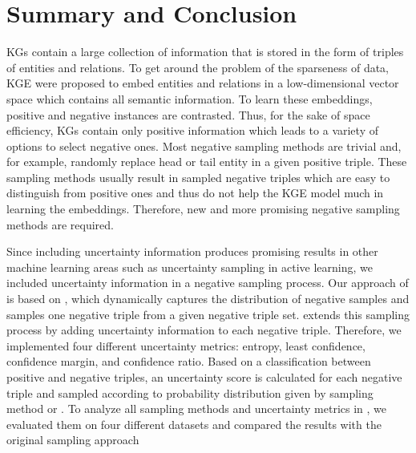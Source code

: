 \section{Summary and Conclusion}  
\label{sec:summary_and_conclusion}
\acp{KG} contain a large collection of information that is stored in the form of triples of entities and relations.
To get around the problem of the sparseness of data, \ac{KGE} were proposed to embed entities and relations in a low-dimensional vector space which contains all semantic information.
To learn these embeddings, positive and negative instances are contrasted.
Thus, for the sake of space efficiency, \acp{KG} contain only positive information which leads to a variety of options to select negative ones.
Most negative sampling methods are trivial and, for example, randomly replace head or tail entity in a given positive triple.
These sampling methods usually result in sampled negative triples which are easy to distinguish from positive ones and thus do not help the \ac{KGE} model much in learning the embeddings. 
Therefore, new and more promising negative sampling methods are required.

Since including uncertainty information produces promising results in other machine learning areas such as uncertainty sampling in active learning, we included uncertainty information in a negative sampling process.
Our approach of \usgan is based on \kbgan, which dynamically captures the distribution of negative samples and samples one negative triple from a given negative triple set.
\usgan extends this sampling process by adding uncertainty information to each negative triple.
Therefore, we implemented four different uncertainty metrics: entropy, least confidence, confidence margin, and confidence ratio.
Based on a classification between positive and negative triples, an uncertainty score is calculated for each negative triple and sampled according to probability distribution given by sampling method \ussoftmax or \usmax.
To analyze all sampling methods and uncertainty metrics in \usgan, we evaluated them on four different datasets and compared the results with the original \kbgan sampling approach 


